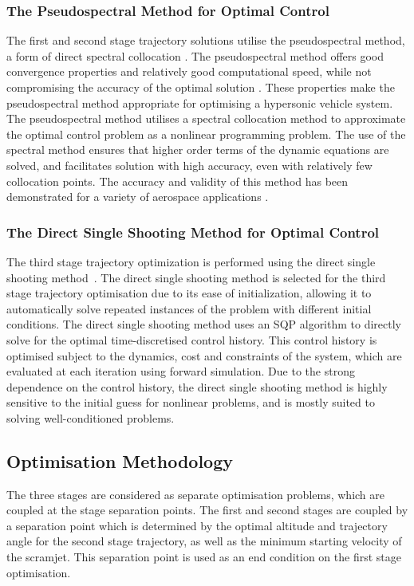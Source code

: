 \documentclass[journal]{new-aiaa}
\begin{document}
\subsubsection{The Pseudospectral Method for Optimal Control}
The first and second stage trajectory solutions utilise the pseudospectral method, a form of direct spectral collocation \cite{Fahroo2000}. The pseudospectral method offers good convergence properties and relatively good computational speed, while not compromising the accuracy of the optimal solution \cite{Fasano2013}. These properties make the pseudospectral method appropriate for optimising a hypersonic vehicle system. 
The pseudospectral method utilises a spectral collocation method to approximate the optimal control problem as a nonlinear programming problem. The use of the spectral method ensures that higher order terms of the dynamic equations are solved, and facilitates solution with high accuracy, even with relatively few collocation points\cite{Fahroo1999}. The accuracy and validity of this method has been demonstrated for a variety of aerospace applications \cite{Bedrossian,Huntington2008,Josselyn2002,Yan2007}. 

\subsubsection{The Direct Single Shooting Method for Optimal Control}

The third stage trajectory optimization is performed using the direct single shooting method~\cite{Diehl2006}. The direct single shooting method is selected for the third stage trajectory optimisation due to its ease of initialization, allowing it to automatically solve repeated instances of the problem with different initial conditions. 
The direct single shooting method uses an SQP algorithm to directly solve for the optimal time-discretised control history.
This control history is optimised subject to the dynamics, cost and constraints of the system, which are evaluated at each iteration using forward simulation.
Due to the strong dependence on the control history, the direct single shooting method is highly sensitive to the initial guess for nonlinear problems, and is mostly suited to solving well-conditioned problems.




\subsection{Optimisation Methodology}
	 The three stages are considered as separate optimisation problems, which are coupled at the stage separation points.
	 The first and second stages are coupled by a separation point which is determined by the optimal altitude and trajectory angle for the second stage trajectory, as well as the minimum starting velocity of the scramjet. This separation point is used as an end condition on the first stage optimisation.
	 
\end{document}
